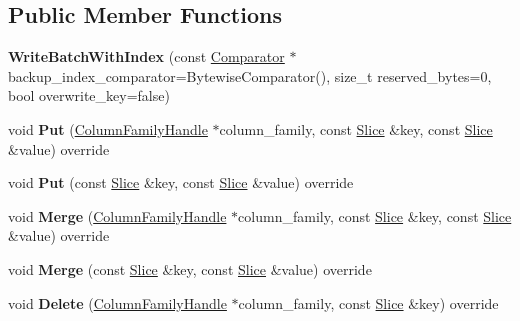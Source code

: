 \subsection*{Public Member Functions}
\begin{DoxyCompactItemize}
\item 
{\bfseries Write\+Batch\+With\+Index} (const \hyperlink{classrocksdb_1_1Comparator}{Comparator} $\ast$backup\+\_\+index\+\_\+comparator=Bytewise\+Comparator(), size\+\_\+t reserved\+\_\+bytes=0, bool overwrite\+\_\+key=false)\hypertarget{classrocksdb_1_1WriteBatchWithIndex_ae30239148711ea91f9f74c0ff35a050a}{}\label{classrocksdb_1_1WriteBatchWithIndex_ae30239148711ea91f9f74c0ff35a050a}

\item 
void {\bfseries Put} (\hyperlink{classrocksdb_1_1ColumnFamilyHandle}{Column\+Family\+Handle} $\ast$column\+\_\+family, const \hyperlink{classrocksdb_1_1Slice}{Slice} \&key, const \hyperlink{classrocksdb_1_1Slice}{Slice} \&value) override\hypertarget{classrocksdb_1_1WriteBatchWithIndex_a65947d01dc77091d9a5a73485dd804ff}{}\label{classrocksdb_1_1WriteBatchWithIndex_a65947d01dc77091d9a5a73485dd804ff}

\item 
void {\bfseries Put} (const \hyperlink{classrocksdb_1_1Slice}{Slice} \&key, const \hyperlink{classrocksdb_1_1Slice}{Slice} \&value) override\hypertarget{classrocksdb_1_1WriteBatchWithIndex_a84a48bbbb10429133b09de7f3b5d38e0}{}\label{classrocksdb_1_1WriteBatchWithIndex_a84a48bbbb10429133b09de7f3b5d38e0}

\item 
void {\bfseries Merge} (\hyperlink{classrocksdb_1_1ColumnFamilyHandle}{Column\+Family\+Handle} $\ast$column\+\_\+family, const \hyperlink{classrocksdb_1_1Slice}{Slice} \&key, const \hyperlink{classrocksdb_1_1Slice}{Slice} \&value) override\hypertarget{classrocksdb_1_1WriteBatchWithIndex_ad59982d64a80a24201930158499bd927}{}\label{classrocksdb_1_1WriteBatchWithIndex_ad59982d64a80a24201930158499bd927}

\item 
void {\bfseries Merge} (const \hyperlink{classrocksdb_1_1Slice}{Slice} \&key, const \hyperlink{classrocksdb_1_1Slice}{Slice} \&value) override\hypertarget{classrocksdb_1_1WriteBatchWithIndex_a4c8be96a087e0376a7523be2993732e6}{}\label{classrocksdb_1_1WriteBatchWithIndex_a4c8be96a087e0376a7523be2993732e6}

\item 
void {\bfseries Delete} (\hyperlink{classrocksdb_1_1ColumnFamilyHandle}{Column\+Family\+Handle} $\ast$column\+\_\+family, const \hyperlink{classrocksdb_1_1Slice}{Slice} \&key) override\hypertarget{classrocksdb_1_1WriteBatchWithIndex_ad7dee3429735282d18652b8ea0d5b06c}{}\label{classrocksdb_1_1WriteBatchWithIndex_ad7dee3429735282d18652b8ea0d5b06c}


\end{DoxyCompactItemize}
